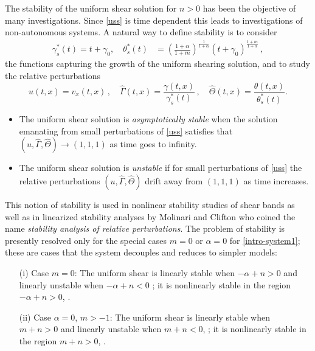 \documentclass[11pt]{article}
\theoremstyle{remark}
\begin{document}
The stability of the uniform shear solution for $n > 0$ has been the objective of many investigations. Since \eqref{uss} is time dependent this
leads to investigations of non-autonomous systems. A natural way to define stability is to consider
\begin{equation} \label{ussgr}
\begin{aligned}
\gamma_s^* (t) = t+\gamma_0,  \quad
\theta_s^* (t) &=  \left( \tfrac{1+\alpha}{1+m }\right )^{\frac{1}{1+\alpha}}  (t+\gamma_0)^{\frac{1 + m}{1+\alpha}} \, ,
\end{aligned}
\end{equation}
the functions capturing the growth of the uniform shearing solution, and to study the relative perturbations
\begin{equation}
u (t,x) = v_x (t,x) \, , \quad \hat\Gamma (t,x) = \frac{\gamma (t,x)}{\gamma_s^* (t)} \, , \quad \hat\Theta (t,x) = \frac{\theta (t,x)}{\theta_s^* (t)}.
\end{equation}
\begin{itemize}
\item
The uniform shear solution is {\it asymptotically stable} when the solution emanating from small perturbations
of \eqref{uss} satisfies that $(u, \hat\Gamma, \hat\Theta) \to (1,1,1)$ as time goes to infinity.
\item
The uniform shear solution is {\it unstable} if for small perturbations of \eqref{uss} the relative perturbations
$(u, \hat\Gamma, \hat\Theta)$ drift away from $(1,1,1)$ as time increases.
\end{itemize}

This notion of stability is used in nonlinear stability studies of shear bands \cite{DH_1983,Tz_1986} as well as
in linearized stability analyses by  Molinari and Clifton \cite{MC,FM}
who coined the name {\it stability analysis of relative perturbations}. The problem of stability is presently resolved only for the special cases
$m=0$ or $\alpha = 0$ for \eqref{intro-system1};  these are cases that the system decouples and reduces to simpler models:
\begin{itemize}
\item[(i)] Case $m=0$: The uniform shear is linearly stable when $-\alpha + n > 0$ and linearly unstable when $-\alpha + n < 0$ \cite{MC,FM};
it is nonlinearly stable in the region $-\alpha + n > 0$, \cite{Tz_1986}.
\item[(ii)] Case $\alpha =0$, $m > -1$: The uniform shear is linearly stable when $m + n > 0$ and linearly unstable when $m+ n < 0$, \cite{FM,tzavaras_nonlinear_1992};
it is nonlinearly stable in the region $m + n > 0$, \cite{tzavaras_plastic_1986}.
\end{itemize}
\end{document}

